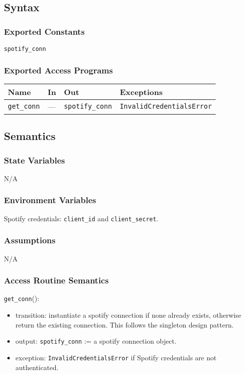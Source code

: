 \documentclass[12pt, titlepage]{article}
\begin{document}
\subsection{Syntax}

\subsubsection{Exported Constants}
\texttt{spotify\_conn}

\subsubsection{Exported Access Programs}

\begin{center}
\begin{tabular}{llll}
\hline
\textbf{Name} & \textbf{In} & \textbf{Out} & \textbf{Exceptions}\\
\hline
\texttt{get\_conn} & --- & \texttt{spotify\_conn} & \texttt{InvalidCredentialsError} \\
\hline
\end{tabular}
\end{center}

\subsection{Semantics}

\subsubsection{State Variables}
N/A

\subsubsection{Environment Variables}
Spotify credentials: \texttt{client\_id} and \texttt{client\_secret}.

\subsubsection{Assumptions}
N/A

\subsubsection{Access Routine Semantics}

\noindent \texttt{get\_conn}():
\begin{itemize}
  \item transition: instantiate a spotify connection if none already exists, otherwise return the existing connection. This follows the singleton design pattern.
  \item output: \texttt{spotify\_conn} := a spotify connection object.
\item exception: \texttt{InvalidCredentialsError} if Spotify credentials are not authenticated.
\end{itemize}
\end{document}
